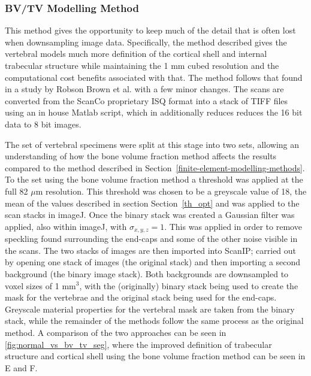 \subsubsection{BV/TV Modelling Method}\label{bvtv_method}

This method gives the opportunity to keep much of the detail that is often lost when downsampling image data.
Specifically, the method described gives the vertebral models much more definition of the cortical shell and internal trabecular structure while maintaining the 1 mm cubed resolution and the computational cost benefits associated with that.
The method follows that found in a study by Robson Brown et al.
\cite{RobsonBrown2014} with a few minor changes. The scans are converted from the ScanCo proprietary ISQ format into a stack of TIFF files using an in house Matlab script, which in additionally reduces reduces the 16 bit data to 8 bit images.

The set of vertebral specimens were split at this stage into two sets, allowing
an understanding of how the bone volume fraction method affects the results compared to the method described in Section~\ref{finite-element-modelling-methods}.
To the set using the bone volume fraction method a threshold was applied at the full 82 $\mu$m resolution.
This threshold was chosen to be a greyscale value of 18, the mean of the values described in section Section~\ref{th_opt} and was applied to the scan stacks in imageJ.
Once the binary stack was created a Gaussian filter was applied, also within imageJ, with $
\sigma_{x,y,z} = 1 $.
This was applied in order to remove speckling found surrounding the end-caps and some of the other noise visible in the scans.
The two stacks of images are then imported into ScanIP; carried
out by opening one stack of images (the original stack) and then importing a
second background (the binary image stack). Both backgrounds are downsampled to
voxel sizes of 1 mm$^3$, with the (originally) binary stack being used to create
the mask for the vertebrae and the original stack being used for the end-caps.
Greyscale material properties for the vertebral mask are taken from the binary
stack, while the remainder of the methods follow the same process as the
original method.
A comparison of the two approaches can be seen in \cref{fig:normal_vs_bv_tv_seg}, where the improved definition of trabecular structure and cortical shell using the bone volume fraction method can be seen in E and F.

